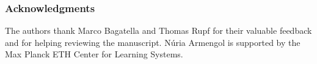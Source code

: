 \documentclass[10pt]{article} %
\begin{document}


% 

\subsubsection*{Acknowledgments}
\label{sec:ack}
The authors thank Marco Bagatella and Thomas Rupf for their valuable feedback and for helping reviewing the manuscript.
Núria Armengol is supported by the Max Planck ETH Center for Learning Systems.







\end{document}
